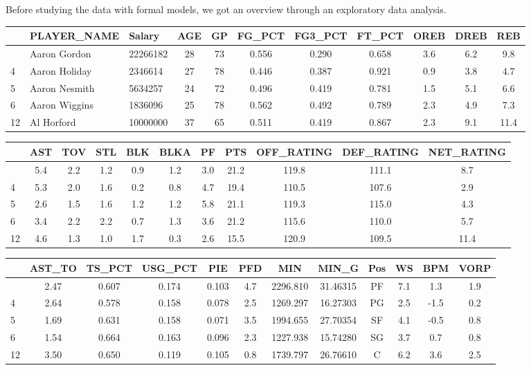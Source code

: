 \documentclass[
]{article}
\begin{document}
Before studying the data with formal models, we got an overview through
an exploratory data analysis.

\begin{longtable}[]{@{}lllcccccccc@{}}
\toprule\noalign{}
& PLAYER\_NAME & Salary & AGE & GP & FG\_PCT & FG3\_PCT & FT\_PCT & OREB
& DREB & REB \\
\midrule\noalign{}
\endhead
\bottomrule\noalign{}
\endlastfoot
3 & Aaron Gordon & 22266182 & 28 & 73 & 0.556 & 0.290 & 0.658 & 3.6 &
6.2 & 9.8 \\
4 & Aaron Holiday & 2346614 & 27 & 78 & 0.446 & 0.387 & 0.921 & 0.9 &
3.8 & 4.7 \\
5 & Aaron Nesmith & 5634257 & 24 & 72 & 0.496 & 0.419 & 0.781 & 1.5 &
5.1 & 6.6 \\
6 & Aaron Wiggins & 1836096 & 25 & 78 & 0.562 & 0.492 & 0.789 & 2.3 &
4.9 & 7.3 \\
12 & Al Horford & 10000000 & 37 & 65 & 0.511 & 0.419 & 0.867 & 2.3 & 9.1
& 11.4 \\
\end{longtable}

\begin{longtable}[]{@{}lcccccccccc@{}}
\toprule\noalign{}
& AST & TOV & STL & BLK & BLKA & PF & PTS & OFF\_RATING & DEF\_RATING &
NET\_RATING \\
\midrule\noalign{}
\endhead
\bottomrule\noalign{}
\endlastfoot
3 & 5.4 & 2.2 & 1.2 & 0.9 & 1.2 & 3.0 & 21.2 & 119.8 & 111.1 & 8.7 \\
4 & 5.3 & 2.0 & 1.6 & 0.2 & 0.8 & 4.7 & 19.4 & 110.5 & 107.6 & 2.9 \\
5 & 2.6 & 1.5 & 1.6 & 1.2 & 1.2 & 5.8 & 21.1 & 119.3 & 115.0 & 4.3 \\
6 & 3.4 & 2.2 & 2.2 & 0.7 & 1.3 & 3.6 & 21.2 & 115.6 & 110.0 & 5.7 \\
12 & 4.6 & 1.3 & 1.0 & 1.7 & 0.3 & 2.6 & 15.5 & 120.9 & 109.5 & 11.4 \\
\end{longtable}

\begin{longtable}[]{@{}lccccccccccc@{}}
\toprule\noalign{}
& AST\_TO & TS\_PCT & USG\_PCT & PIE & PFD & MIN & MIN\_G & Pos & WS &
BPM & VORP \\
\midrule\noalign{}
\endhead
\bottomrule\noalign{}
\endlastfoot
3 & 2.47 & 0.607 & 0.174 & 0.103 & 4.7 & 2296.810 & 31.46315 & PF & 7.1
& 1.3 & 1.9 \\
4 & 2.64 & 0.578 & 0.158 & 0.078 & 2.5 & 1269.297 & 16.27303 & PG & 2.5
& -1.5 & 0.2 \\
5 & 1.69 & 0.631 & 0.158 & 0.071 & 3.5 & 1994.655 & 27.70354 & SF & 4.1
& -0.5 & 0.8 \\
6 & 1.54 & 0.664 & 0.163 & 0.096 & 2.3 & 1227.938 & 15.74280 & SG & 3.7
& 0.7 & 0.8 \\
12 & 3.50 & 0.650 & 0.119 & 0.105 & 0.8 & 1739.797 & 26.76610 & C & 6.2
& 3.6 & 2.5 \\
\end{longtable}
\end{document}
